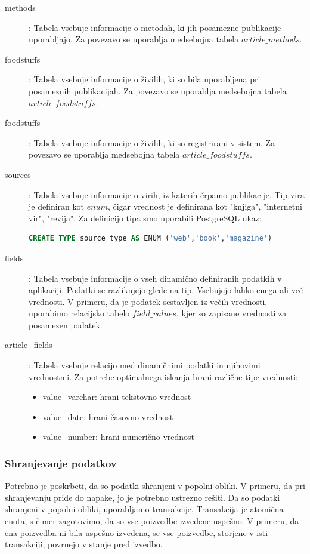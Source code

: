 \documentclass[a4paper, 12pt]{book}
\begin{document}
\begin{description}
\item[methods]: Tabela vsebuje informacije o metodah, ki jih posamezne publikacije uporabljajo. Za povezavo se uporablja medsebojna tabela $article\_methods$.

\item[foodstuffs]: Tabela vsebuje informacije o živilih, ki so bila uporabljena pri posameznih publikacijah. Za povezavo se uporablja medsebojna tabela $article\_foodstuffs$.

\item[foodstuffs]: Tabela vsebuje informacije o živilih, ki so registrirani v sistem. Za povezavo se uporablja medsebojna tabela $article\_foodstuffs$.

\item[sources]: Tabela vsebuje informacije o virih, iz katerih črpamo publikacije. Tip vira je definiran kot $enum$, čigar vrednost je definirana kot "knjiga", "internetni vir", "revija". Za definicijo tipa smo uporabili PostgreSQL ukaz:
\begin{lstlisting}[language=sql, style=mystyle]
CREATE TYPE source_type AS ENUM ('web','book','magazine')
\end{lstlisting}

\item[fields]: Tabela vsebuje informacije o vseh dinamično definiranih podatkih v aplikaciji. Podatki se razlikujejo glede na tip. Vsebujejo lahko enega ali več vrednosti. V primeru, da je podatek sestavljen iz večih vrednosti, uporabimo relacijsko tabelo $field\_values$, kjer so zapisane vrednosti za posamezen podatek.

\item[article\_fields]: Tabela vsebuje relacijo med dinamičnimi podatki in njihovimi vrednostmi. Za potrebe optimalnega iskanja hrani različne tipe vrednosti: 
\begin{itemize}
    \item value\_varchar: hrani tekstovno vrednost 
    \item value\_date: hrani časovno vrednost
    \item value\_number: hrani numerično vrednost
\end{itemize}
\end{description}

\subsubsection{Shranjevanje podatkov}
Potrebno je poskrbeti, da so podatki shranjeni v popolni obliki. V primeru, da pri shranjevanju pride do napake, jo je potrebno ustrezno rešiti. Da so podatki shranjeni v popolni obliki, uporabljamo transakcije. Transakcija je atomična enota, s čimer zagotovimo, da so vse poizvedbe izvedene uspešno. V primeru, da ena poizvedba ni bila uspešno izvedena, se vse poizvedbe, storjene v isti transakciji, povrnejo v stanje pred izvedbo. 
\end{document}
